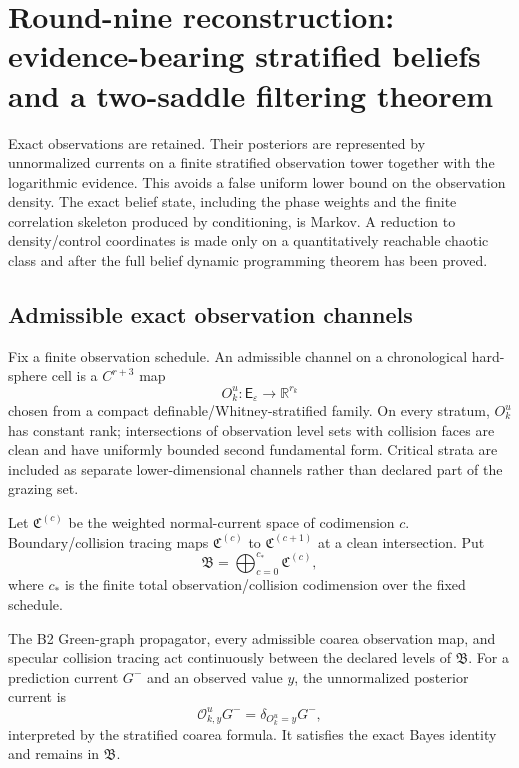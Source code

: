 \section{Round-nine reconstruction: evidence-bearing stratified beliefs and a two-saddle filtering theorem}
\label{sec:r9-c1}

Exact observations are retained.  Their posteriors are represented by
unnormalized currents on a finite stratified observation tower together with
the logarithmic evidence.  This avoids a false uniform lower bound on the
observation density.  The exact belief state, including the phase weights and
the finite correlation skeleton produced by conditioning, is Markov.  A
reduction to density/control coordinates is made only on a quantitatively
reachable chaotic class and after the full belief dynamic programming theorem
has been proved.

\subsection{Admissible exact observation channels}

Fix a finite observation schedule.  An admissible channel on a chronological
hard-sphere cell is a $C^{r+3}$ map
\[
 O_k^u:\mathsf E_\varepsilon\longrightarrow\mathbb R^{r_k}
\]
chosen from a compact definable/Whitney-stratified family.  On every stratum,
$O_k^u$ has constant rank; intersections of observation level sets with
collision faces are clean and have uniformly bounded second fundamental form.
Critical strata are included as separate lower-dimensional channels rather
than declared part of the grazing set.

Let $\mathfrak C^{(c)}$ be the weighted normal-current space of codimension
$c$.  Boundary/collision tracing maps
$\mathfrak C^{(c)}$ to $\mathfrak C^{(c+1)}$ at a clean intersection.  Put
\[
 \mathfrak B=\bigoplus_{c=0}^{c_*}\mathfrak C^{(c)},
\]
where $c_*$ is the finite total observation/collision codimension over the
fixed schedule.

\begin{theorem}
\label{thm:r9-c1-tower}
The B2 Green-graph propagator, every admissible coarea observation map, and
specular collision tracing act continuously between the declared levels of
$\mathfrak B$.  For a prediction current $G^-$ and an observed value $y$, the
unnormalized posterior current is
\[
 \mathcal O_{k,y}^uG^-
 =\delta_{O_k^u=y}G^-,
\]
interpreted by the stratified coarea formula.  It satisfies the exact Bayes
identity and remains in $\mathfrak B$.
\end{theorem}

